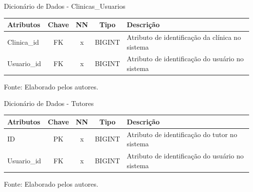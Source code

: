 \documentclass[
    12pt,               %
    openright,          %
    oneside,
    a4paper,            %
    BIBLATEX,           %
    TODO,               %
    english,            %
    brazil              %
    ]{ifsp-spo-inf-ctds}
\begin{document}
    \begin{center}
        \begin{quadro}[H]
        \centering
                \caption{Dicionário de Dados - Clinicas\_Usuarios}
                  \begin{tabulary}{1.0\textwidth}{|p{9em}|c|c|c|p{19em}|}
            \hline
            Atributos & Chave & NN & Tipo & Descrição\\
            \hline
            Clinica\_id & FK & x & BIGINT & Atributo de identificação da clínica no sistema \\
            \hline
            Usuario\_id & FK & x & BIGINT & Atributo de identificação do usuário no sistema\\
            \hline
            \end{tabulary}
                 
                \label{qd: md-clinica-usuarios}
                \centering
        {\footnotesize Fonte: Elaborado pelos autores.}
              \end{quadro}
            \end{center}      
            
    \begin{center}
        \begin{quadro}[H]
        \centering
                \caption{Dicionário de Dados - Tutores}
                  \begin{tabulary}{1.0\textwidth}{|p{9em}|c|c|c|p{19em}|}
            \hline
            Atributos & Chave & NN & Tipo & Descrição\\
            \hline
            ID & PK & x & BIGINT & Atributo de identificação do tutor no sistema \\
            \hline
            Usuario\_id & FK & x & BIGINT & Atributo de identificação do usuário no sistema\\
            \hline
            \end{tabulary}
                 
                \label{qd: md-tutor}
                \centering
        {\footnotesize Fonte: Elaborado pelos autores.}
              \end{quadro}
            \end{center}
\end{document}
